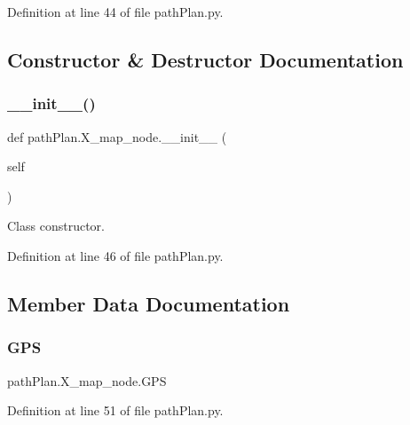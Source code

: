 Definition at line 44 of file path\+Plan.\+py.



\subsection{Constructor \& Destructor Documentation}
\mbox{\label{classpath_plan_1_1_x__map__node_ad8593e6f5daa3f094d7486fb158d76b3}} 
\subsubsection{\texorpdfstring{\+\_\+\+\_\+init\+\_\+\+\_\+()}{\_\_init\_\_()}}
{\footnotesize\ttfamily def path\+Plan.\+X\+\_\+map\+\_\+node.\+\_\+\+\_\+init\+\_\+\+\_\+ (\begin{DoxyParamCaption}\item[{}]{self }\end{DoxyParamCaption})}



Class constructor. 



Definition at line 46 of file path\+Plan.\+py.



\subsection{Member Data Documentation}
\mbox{\label{classpath_plan_1_1_x__map__node_a6303c4d6ec252f4b039be4c70721e432}} 
\subsubsection{\texorpdfstring{G\+PS}{GPS}}
{\footnotesize\ttfamily path\+Plan.\+X\+\_\+map\+\_\+node.\+G\+PS}



Definition at line 51 of file path\+Plan.\+py.

